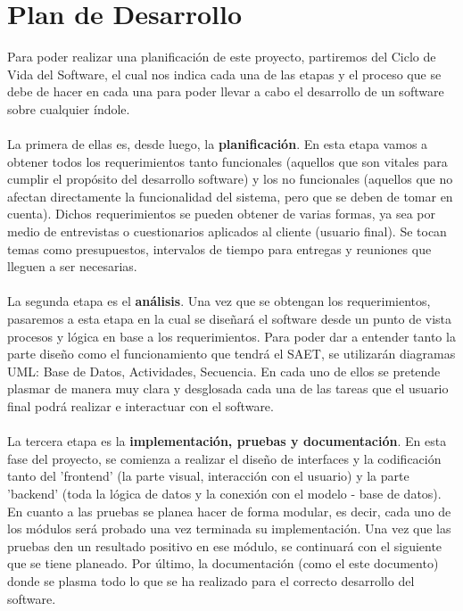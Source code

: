 \section{Plan de Desarrollo}
Para poder realizar una planificación de este proyecto, partiremos del Ciclo de Vida del Software, el cual nos indica cada una de las etapas y el proceso que se debe de hacer en cada una para poder llevar a cabo el desarrollo de un software sobre cualquier índole. 
\\ \\
La primera de ellas es, desde luego, la \textbf{planificación}. En esta etapa vamos a obtener todos los requerimientos tanto funcionales (aquellos que son vitales para cumplir el propósito del desarrollo software) y los no funcionales (aquellos que no afectan directamente la funcionalidad del sistema, pero que se deben de tomar en cuenta). Dichos requerimientos se pueden obtener de varias formas, ya sea por medio de entrevistas o cuestionarios aplicados al cliente (usuario final). Se tocan temas como presupuestos, intervalos de tiempo para entregas y reuniones que lleguen a ser necesarias.
\\ \\
 La segunda etapa es el \textbf{análisis}. Una vez que se obtengan los requerimientos, pasaremos a esta etapa en la cual se diseñará el software desde un punto de vista procesos y lógica en base a los requerimientos. Para poder dar a entender tanto la parte diseño como el funcionamiento que tendrá el SAET, se utilizarán diagramas UML: Base de Datos, Actividades, Secuencia. En cada uno de ellos se pretende plasmar de manera muy clara y desglosada cada una de las tareas que el usuario final podrá realizar e interactuar con el software.
 \\ \\
 La tercera etapa es la \textbf{implementación, pruebas y documentación}. En esta fase del proyecto, se comienza a realizar el diseño de interfaces y la codificación tanto del 'frontend' (la parte visual, interacción con el usuario) y la parte 'backend' (toda la lógica de datos y la conexión con el modelo - base de datos). En cuanto a las pruebas se planea hacer de forma modular, es decir, cada uno de los módulos será probado una vez terminada su implementación. Una vez que las pruebas den un resultado positivo en ese módulo, se continuará con el siguiente que se tiene planeado. Por último, la documentación (como el este documento) donde se plasma todo lo que se ha realizado para el correcto desarrollo del software. 
 \\ \\
